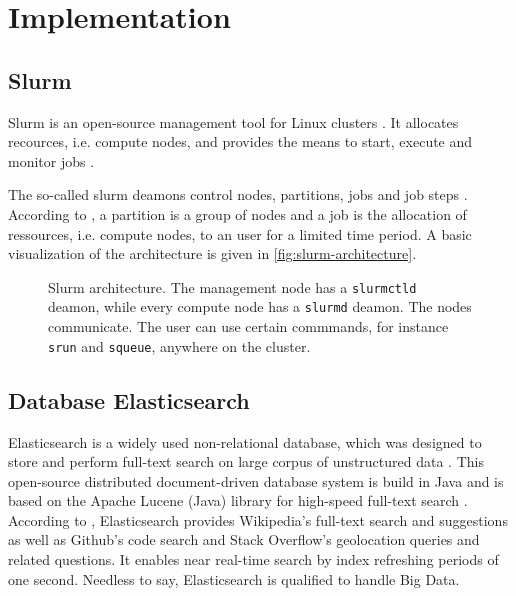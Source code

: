 \newcommand{\databaseName}{Elasticsearch}
\chapter{Implementation}\label{ch:implementation}


\section{Slurm}\label{subsec:slurm}

Slurm is an open-source management tool for Linux clusters \cite{slurm-online}.
It allocates recources, i.e. compute nodes, and provides the means to start, execute and monitor jobs \cite{slurm-online, slurm2003}.

The so-called slurm deamons control nodes, partitions, jobs and job steps \cite{slurm-online}.
According to \citeauthor{slurm-online}, a partition is a group of nodes and a job is the allocation of ressources, i.e. compute nodes, to an user for a limited time period.
A basic visualization of the architecture is given in \autoref{fig:slurm-architecture}.

\begin{figure}[htp] %
    \centering
    
    \caption{Slurm architecture. The management node has a \texttt{slurmctld} deamon, while every compute node has a \texttt{slurmd} deamon.
    The nodes communicate.
    The user can use certain commmands, for instance \texttt{srun} and \texttt{squeue}, anywhere on the cluster.
    }
    \label{fig:slurm-architecture}
\end{figure}






\section{Database Elasticsearch}\label{subsec:db}
\databaseName{} is a widely used non-relational database, which was designed to store and perform full-text search on large corpus of unstructured data \cite{Elasticsearch2017}.
This open-source distributed document-driven database system is build in Java and is based on the Apache Lucene (Java) library for high-speed full-text search \cite{Elasticsearch2017,Elasticsearch2019}.
According to \citeauthor{Elasticsearch2019}, \databaseName{} provides Wikipedia's full-text search and suggestions as well as Github's code search and Stack Overflow's geolocation queries and related questions.
It enables near real-time search by index refreshing periods of one second.
Needless to say, \databaseName{} is qualified to handle Big Data.

